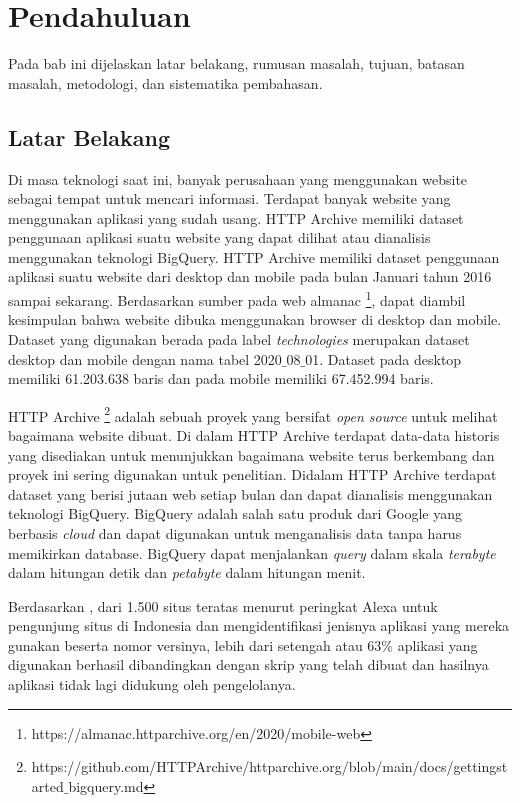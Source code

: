 \chapter{Pendahuluan}
\label{chap:intro}
Pada bab ini dijelaskan latar belakang, rumusan masalah, tujuan, batasan masalah, metodologi, dan sistematika pembahasan.
\section{Latar Belakang}
\label{sec:label}
Di masa teknologi saat ini, banyak perusahaan yang menggunakan website sebagai tempat untuk mencari informasi. Terdapat banyak website yang menggunakan aplikasi yang sudah usang. HTTP Archive memiliki dataset penggunaan aplikasi suatu website yang dapat dilihat atau dianalisis menggunakan teknologi BigQuery. HTTP Archive memiliki dataset penggunaan aplikasi suatu website dari desktop dan mobile pada bulan Januari tahun 2016 sampai sekarang. Berdasarkan sumber pada web almanac \footnote{https://almanac.httparchive.org/en/2020/mobile-web}, dapat diambil kesimpulan bahwa website dibuka menggunakan browser di desktop dan mobile. Dataset yang digunakan berada pada label \textit{technologies} merupakan dataset desktop dan mobile dengan nama tabel 2020$\_$08$\_$01. Dataset pada desktop memiliki 61.203.638 baris dan pada mobile memiliki 67.452.994 baris. 

HTTP Archive \footnote{https://github.com/HTTPArchive/httparchive.org/blob/main/docs/gettingstarted$\_$bigquery.md} adalah sebuah proyek yang bersifat \textit{open source} untuk melihat bagaimana website dibuat. Di dalam HTTP Archive terdapat data-data historis yang disediakan untuk menunjukkan bagaimana website terus berkembang dan proyek ini sering digunakan untuk penelitian. Didalam HTTP Archive terdapat dataset yang berisi jutaan web setiap bulan dan dapat dianalisis menggunakan teknologi BigQuery. BigQuery \cite{bqIntroduction} adalah salah satu produk dari Google yang berbasis \textit{cloud} dan dapat digunakan untuk menganalisis data tanpa harus memikirkan database. BigQuery dapat menjalankan \textit{query} dalam skala \textit{terabyte} dalam hitungan detik dan \textit{petabyte} dalam hitungan menit.

Berdasarkan \cite{pascal}, dari 1.500 situs teratas menurut peringkat Alexa untuk pengunjung situs di Indonesia dan mengidentifikasi jenisnya aplikasi yang mereka gunakan beserta nomor versinya, lebih dari setengah atau 63\% aplikasi yang digunakan berhasil dibandingkan dengan skrip yang telah dibuat dan hasilnya aplikasi tidak lagi didukung oleh pengelolanya.

